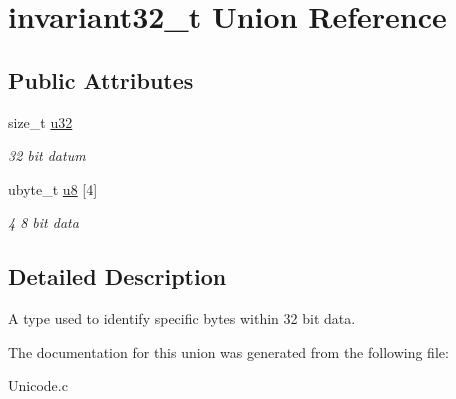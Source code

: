 \hypertarget{unioninvariant32__t}{}\section{invariant32\+\_\+t Union Reference}
\label{unioninvariant32__t}
\subsection*{Public Attributes}
\begin{DoxyCompactItemize}
\item 
\hypertarget{unioninvariant32__t_a654e030e427b8d3453c65544df514039}{}size\+\_\+t \hyperlink{unioninvariant32__t_a654e030e427b8d3453c65544df514039}{u32}\label{unioninvariant32__t_a654e030e427b8d3453c65544df514039}

\begin{DoxyCompactList}\small\item\em 32 bit datum \end{DoxyCompactList}\item 
\hypertarget{unioninvariant32__t_aa58af8ef2318d709a335de30076edb84}{}ubyte\+\_\+t \hyperlink{unioninvariant32__t_aa58af8ef2318d709a335de30076edb84}{u8} \mbox{[}4\mbox{]}\label{unioninvariant32__t_aa58af8ef2318d709a335de30076edb84}

\begin{DoxyCompactList}\small\item\em 4 8 bit data \end{DoxyCompactList}\end{DoxyCompactItemize}


\subsection{Detailed Description}
A type used to identify specific bytes within 32 bit data. 

The documentation for this union was generated from the following file\+:\begin{DoxyCompactItemize}
\item 
Unicode.\+c\end{DoxyCompactItemize}
